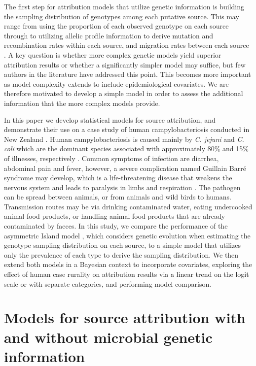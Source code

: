 \documentclass[AMA,STIX1COL]{WileyNJD-v2}
\begin{document}
The first step for attribution models that utilize genetic information is building the sampling distribution of genotypes among each putative source. This may range from using the proportion of each observed genotype \cite{Hald} on each source through to utilizing allelic profile information to derive mutation and recombination rates within each source, and migration rates between each source \cite{Wilso}. A key question is whether more complex genetic models yield superior attribution results or whether a significantly simpler model may suffice, but few authors in the literature have addressed this point. This becomes more important as model complexity extends to include epidemiological covariates. We are therefore motivated to develop a simple model in order to assess the additional information that the more complex models provide.

In this paper we develop statistical models for source attribution, and demonstrate their use on a case study of human campylobacteriosis conducted in New Zealand \cite{Marsh}. Human campylobacteriosis is caused mainly by \textit{C. jejuni} and \textit{C. coli} which are the dominant species associated with approximately 80\% and 15\% of illnesses, respectively \cite{Guert}. Common symptoms of infection are diarrhea, abdominal pain and fever, however, a severe complication named Guillain Barr\'{e} syndrome may develop, which is a life-threatening disease that weakens the nervous system and leads to paralysis in limbs and respiration \cite{Hanha}. The pathogen can be spread between animals, or from animals and wild birds to humans. Transmission routes may be via drinking contaminated water, eating undercooked animal food products, or handling animal food products that are already contaminated by faeces. In this study, we compare the performance of the asymmetric Island model \cite{Wilso}, which considers genetic evolution when estimating the genotype sampling distribution on each source, to a simple model that utilizes only the prevalence of each type to derive the sampling distribution. We then extend both models in a Bayesian context to incorporate covariates, exploring the effect of human case rurality on attribution results via a linear trend on the logit scale or with separate categories, and performing model comparison.

\section{Models for source attribution with and without microbial genetic information}
\end{document}
